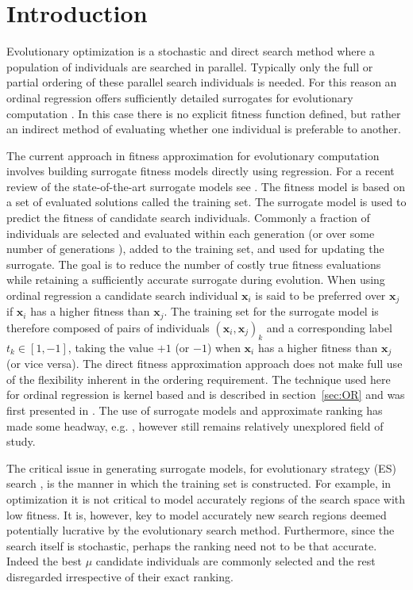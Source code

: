 \documentclass[10pt, conference]{IEEEtran} %
\renewcommand{\vec}[1]{\mathbf{#1}}
\begin{document}
\section{Introduction}\label{sec:introduction}
Evolutionary optimization is a stochastic and direct search method where a population of individuals are searched in parallel.  Typically only the full or partial ordering of these parallel search individuals is needed.  For this reason an ordinal regression offers sufficiently detailed surrogates for evolutionary computation \cite{Ru06:PPSN}.  In this case there is no explicit fitness function defined, but rather an indirect method of evaluating whether one individual is preferable to another.

The current approach in fitness approximation for evolutionary computation involves building surrogate fitness models directly using regression.  For a recent review of the state-of-the-art surrogate models see \cite{Ong04,SLK05,Jin05,Lim2007}. The fitness model is based on a set of evaluated solutions called the training set. The surrogate model is used to predict the fitness of candidate search individuals. Commonly a fraction of individuals are selected and evaluated within each generation (or over some number of generations \cite{JOS02}), added to the training set, and used for updating the surrogate.  The goal is to reduce the number of costly true fitness evaluations while retaining a sufficiently accurate surrogate during evolution. When using ordinal regression a candidate search individual $\vec{x}_i$ is said to be preferred over $\vec{x}_j$ if $\vec{x}_i$ has a higher fitness than $\vec{x}_j$. The training set for the surrogate model is therefore composed of pairs of individuals $(\vec{x}_i,\vec{x}_j)_k$ and a corresponding label $t_k\in[1,-1]$, taking the value $+1$ (or $-1$) when $\vec{x}_i$ has a higher fitness than $\vec{x}_j$ (or vice versa).  The direct fitness approximation approach does not make full use of the flexibility inherent in the ordering requirement. The technique used here for ordinal regression is kernel based and is described in section~\ref{sec:OR} and was first presented in \cite{Ru06:PPSN}. The use of surrogate models and approximate  ranking has made some headway, e.g. \cite{Loshchilov2010}, however still remains relatively unexplored field of study.

The critical issue in generating surrogate models, for evolutionary strategy (ES) search \cite{Schw95:book}, is the manner in which the training set is constructed. For example, in optimization it is not critical to model accurately regions of the search space with low fitness. It is, however, key to model accurately new search regions deemed potentially lucrative by the evolutionary search method. Furthermore, since the search itself is stochastic, perhaps the ranking need not to be that accurate. Indeed the best $\mu$ candidate individuals are commonly selected and the rest disregarded irrespective of their exact ranking. 
\end{document}

